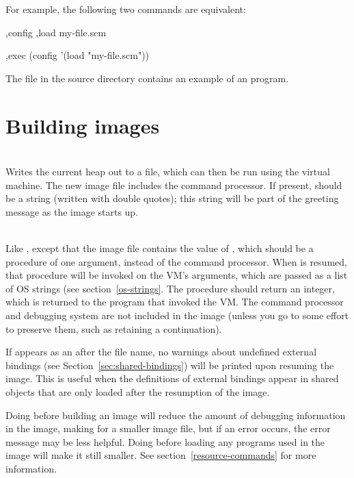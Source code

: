 For example, the following two commands are equivalent:
\begin{example}
,config ,load my-file.scm

,exec (config '(load "my-file.scm"))
\end{example}

The file  in the source directory contains an
 example of an  program.

\section{Building images}

\begin{description}
\item {}\\
    Writes the current heap out to a file, which can then be run using the
    virtual machine.  The new image file includes the command processor.
    If present, 
    should be a string (written with double quotes); this string will
    be part of the greeting message as the image starts up.

\item {}\\
    Like , except that the image file contains the value of
    , which should be a procedure of one argument, instead of
    the command processor.  When
     is resumed, that procedure will be invoked on the VM's
     arguments, which are passed as a list of OS strings (see
    section~\ref{os-strings}.  The
    procedure should return an integer, which is
    returned to the program that invoked the VM.  The command
    processor and debugging system are not included in the image
    (unless you go to some effort to preserve them, such as retaining
    a continuation).
    
    If  appears as an  after the file
    name, no warnings about undefined external bindings
    (see Section~\ref{sec:shared-bindings}) will be printed upon
    resuming the image.  This is useful when the definitions of
    external bindings appear in shared objects that are only loaded
    after the resumption of the image.

    Doing  before building an image will reduce the amount
    of debugging information in the image, making for a smaller
    image file, but if an error occurs, the error message may be less
    helpful.  Doing  before loading any programs
    used in the image will make it still smaller.
    See section~\ref{resource-commands}
    for more information.

\end{description}
    

